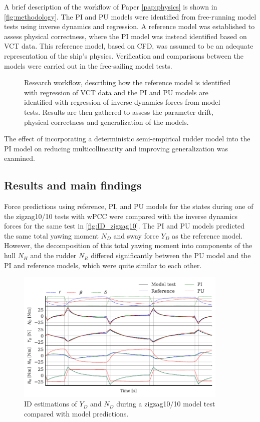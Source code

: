 A brief description of the workflow of Paper \ref{pap:physics} is shown in \autoref{fig:methodology}.
The PI and PU models were identified from free-running model tests using inverse dynamics and regression. A reference model was established to assess physical correctness, where the PI model was instead identified based on VCT data. This reference model, based on CFD, was assumed to be an adequate representation of the ship's physics.
Verification and comparisons between the models were carried out in the free-sailing model tests.
\begin{figure}[h]
  \centering
  
  \caption{Research workflow, describing how the reference model is identified with regression of VCT data and the PI and PU models are identified with regression of inverse dynamics forces from model tests. Results are then gathered to assess the parameter drift, physical correctness and generalization of the models.}
  \label{fig:methodology}
\end{figure}
The effect of incorporating a deterministic semi-empirical rudder model into the PI model on reducing multicollinearity and improving generalization was examined.
\FloatBarrier
\subsection*{Results and main findings}
Force predictions using reference, PI, and PU models for the states during one of the zigzag10/10 tests with wPCC were compared with the inverse dynamics forces for the same test in \autoref{fig:ID_zigzag10}. The PI and PU models predicted the same total yawing moment $N_D$ and sway force $Y_D$ as the reference model. However, the decomposition of this total yawing moment into components of the hull $N_H$ and the rudder $N_R$ differed significantly between the PU model and the PI and reference models, which were quite similar to each other.

\begin{figure}[h] \centering \includegraphics[width=0.9\textwidth]{kappa/images/results.ID_zigzag10.pdf} \caption{ID estimations of $Y_D$ and $N_D$ during a zigzag10/10 model test compared with model predictions.} \label{fig:ID_zigzag10} \end{figure}

